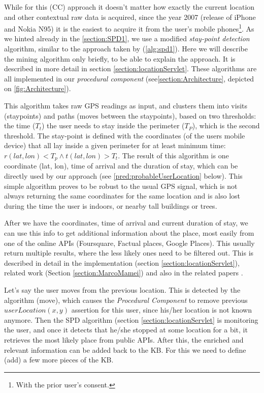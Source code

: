 While for this (CC) approach it doesn't matter how exactly the current location
and other contextual raw data is acquired, since the year 2007 (release of 
iPhone and Nokia N95) it is the easiest to acquire it from the user's mobile 
phones\footnote{With the prior user's consent.}. As we hinted already in the
\autoref{section:SPD1}, we use a modified \emph{stay-point detection} algorithm, 
similar to the approach taken by \textcite{Kang2005} (\autoref{alg:spd1}). 
Here we will describe the mining 
algorithm only briefly, to be able to explain the approach. It is described in
more detail in section \ref{section:locationServlet}. These algorithms are all
implemented in our \emph{procedural component} 
(see\autoref{section:Architecture}, depicted on \autoref{fig:Architecture}).

This algorithm takes raw GPS readings as input, and clusters them into visits
(staypoints) and paths (moves between the staypoints), based on two thresholds:
the time ($T_t$) the user needs to stay
inside the perimeter ($T_P$), which is the second threshold. The stay-point is 
defined with the coordinates (of the users mobile device) that all lay inside a
given perimeter for at least minimum time: 
$r(lat,lon)<T_p \land t(lat,lon)>T_t$. The result of this algorithm is one
coordinate (lat, lon), time of arrival and the duration of stay, which can be
directly used by our approach (see \autoref{pred:probableUserLocation} below). 
This simple algorithm proves 
to be robust to the usual GPS signal, which is not always returning the same 
coordinates for the same location and is also lost during the time the user is
indoors, or nearby tall buildings or trees. 

After we have the coordinates, time of arrival and current duration of stay,
we can use this info to get additional information about the place, most easily
from one of the online APIs (Foursquare, Factual places, Google Places). This
usually return multiple results, where the less likely ones need to be filtered
out. This is described in detail in the implementation 
(section \ref{section:locationServlet}), 
related work (Section \ref{section:MarcoMamei}) and also in the related papers 
\autocite{Mamei2010,Bradesko2015}.

Let's say the user moves from the previous location. This is detected by the
algorithm (move), which causes the \emph{Procedural Component} to remove 
previous $userLocation(x,y)$ assertion for this user, since his/her location is
not known anymore. Then the SPD algorithm (section 
\ref{section:locationServlet} is monitoring the user, and 
once it detects that he/she stopped at some location for a bit, it retrieves 
the most likely place from public APIs. After this, the enriched and relevant 
information can be added 
back to the KB. For this we need to define (add) a few more pieces of the KB.

